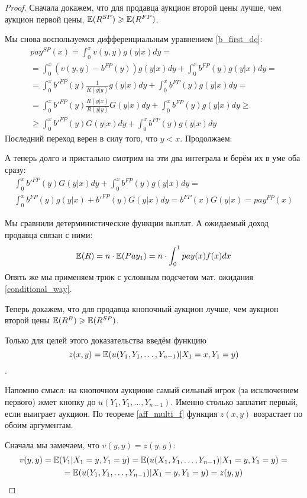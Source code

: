 \begin{proof}
Сначала докажем, что для продавца аукцион второй цены лучше, чем аукцион первой цены, $ \mathbb{E}(R^{SP})\geqslant \mathbb{E}(R^{FP}) $.


Мы снова воспользуемся дифференциальным уравнением \ref{b_first_de}:
\begin{multline}
pay^{SP}(x)=\int_{0}^{x}v(y,y)g(y|x)dy=\\
=\int_{0}^{x}(v(y,y)-b^{FP}(y))g(y|x)dy+\int_{0}^{x}b^{FP}(y)g(y|x)dy=\\
=\int_{0}^{x}b'^{FP}(y)\frac{1}{R(y|y)}g(y|x)dy+\int_{0}^{x}b^{FP}(y)g(y|x)dy=\\
=\int_{0}^{x}b'^{FP}(y)\frac{R(y|x)}{R(y|y)}G(y|x)dy+\int_{0}^{x}b^{FP}(y)g(y|x)dy\geq\\
\geq \int_{0}^{x}b'^{FP}(y)G(y|x)dy+\int_{0}^{x}b^{FP}(y)g(y|x)dy
\end{multline}
Последний переход верен в силу того, что $ y<x $. Продолжаем:

А теперь долго и пристально смотрим на эти два интеграла и берём их в уме оба сразу:
\begin{multline}
\int_{0}^{x}b'^{FP}(y)G(y|x)dy+\int_{0}^{x}b^{FP}(y)g(y|x)dy=\\
\int_{0}^{x}b^{FP}(y)g(y|x)+b'^{FP}(y)G(y|x) dy=b^{FP}(x)G(y|x)=pay^{FP}(x)
\end{multline}

Мы сравнили детерминистические функции выплат. А ожидаемый доход продавца связан с ними:
\begin{equation}
\mathbb{E}(R)=n\cdot \mathbb{E}(Pay_{1})=n\cdot \int_{0}^{1}pay(x)f(x)dx
\end{equation}
Опять же мы применяем трюк с условным подсчетом мат. ожидания \ref{conditional_way}.

Теперь докажем, что для продавца кнопочный аукцион лучше, чем аукцион второй цены $ \mathbb{E}(R^{B})\geqslant \mathbb{E}(R^{SP}) $.

Только для целей этого доказательства введём функцию $$z(x,y)=\mathbb{E}(u(Y_{1},Y_{1},\ldots,Y_{n-1})|X_{1}=x,Y_{1}=y) $$.

Напомню смысл: на кнопочном аукционе самый сильный игрок (за исключением первого) жмет кнопку до $ u(Y_{1},Y_{1},\ldots,Y_{n-1}) $. Именно столько заплатит первый, если выиграет аукцион. По теореме \ref{aff_multi_f} функция $ z(x,y) $ возрастает по обоим аргументам.

Сначала мы замечаем, что $ v(y,y)=z(y,y) $:
\begin{multline}
v(y,y)=\mathbb{E}(V_{1}|X_{1}=y, Y_{1}=y)=\mathbb{E}(u(X_{1},Y_{1},\ldots,Y_{n-1})|X_{1}=y, Y_{1}=y)=\\
=\mathbb{E}(u(Y_{1},Y_{1},\ldots,Y_{n-1})|X_{1}=y, Y_{1}=y)=z(y,y)
\end{multline}


\end{proof}
